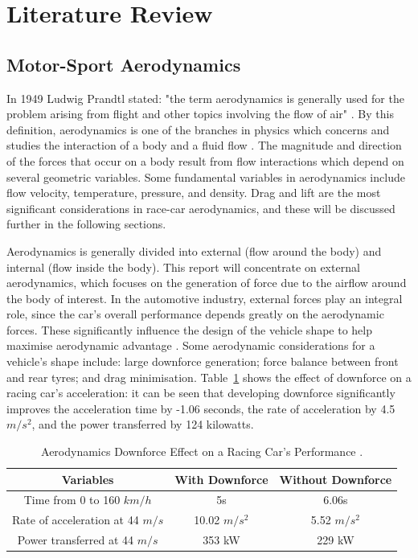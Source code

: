 \section{Literature Review}

\subsection{Motor-Sport Aerodynamics}
In 1949 Ludwig Prandtl stated: "the term aerodynamics is generally used for the problem arising from flight and other topics involving the flow of air" \cite{Anderson2010FundamentalsAerodynamics}. By this definition, aerodynamics is one of the branches in physics which concerns and studies the interaction of a body and a fluid flow \cite{Scibor-Rylski1984RoadAerodynamics}. The magnitude and direction of the forces that occur on a body result from flow interactions which depend on several geometric variables. Some fundamental variables in aerodynamics include flow velocity, temperature, pressure, and density. Drag and lift are the most significant considerations in race-car aerodynamics, and these will be discussed further in the following sections.

\noindent Aerodynamics is generally divided into external (flow around the body) and internal (flow inside the body). This report will concentrate on external aerodynamics, which focuses on the generation of force due to the airflow around the body of interest. In the automotive industry, external forces play an integral role, since the car's overall performance depends greatly on the aerodynamic forces. These significantly influence the design of the vehicle shape to help maximise aerodynamic advantage \cite{Scibor-Rylski1984RoadAerodynamics}. Some aerodynamic considerations for a vehicle's shape include: large downforce generation; force balance between front and rear tyres; and drag minimisation. Table~\ref{Table1} shows the effect of downforce on a racing car's acceleration: it can be seen that developing downforce significantly improves the acceleration time by -1.06 seconds, the rate of acceleration by 4.5 $m/s^2$, and the power transferred by 124 kilowatts. 

\begin{table}[!ht]
\caption{\label{Table1} Aerodynamics Downforce Effect on a Racing Car's Performance \cite{Scibor-Rylski1984RoadAerodynamics}.}
\vspace{-5mm}
\begin{center}
 \begin{tabular}{||c| c| c ||} 
 \hline
 Variables & With Downforce & Without Downforce \\ [0.5ex] 
 \hline\hline
 Time from 0 to 160 $km/h$ & 5s & 6.06s \\ 
 \hline
 Rate of acceleration at 44 $m/s$ & 10.02 $m/s^{2}$ & 5.52 $m/s^2$ \\
 \hline
 Power transferred at 44 $m/s$ & 353 kW & 229 kW  \\
 \hline
\end{tabular}
\end{center}
\end{table}

